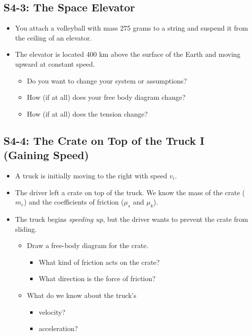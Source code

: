 \documentclass[]{article}
\begin{document}
\newpage
\begin{TeacherMargin}

\end{TeacherMargin}
\begin{PresentSpace}
\vspace{-10pt}
\section*{S4-3: The Space Elevator}
\vspace{-10pt}
\begin{itemize}
	\item You attach a volleyball with mass 275 grams to a string and suspend it from the ceiling of an elevator.
	\item The elevator is located 400 km above the surface of the Earth and moving upward at constant speed.
	\begin{itemize}
		\item Do you want to change your system or assumptions?
		\item How (if at all) does your free body diagram change?
		\item How (if at all) does the tension change?
	\end{itemize}
\end{itemize}
\end{PresentSpace}
\newpage
\begin{TeacherMargin}

\end{TeacherMargin}
\begin{PresentSpace}
\vspace{-10pt}
\section*{S4-4: The Crate on Top of the Truck I (Gaining Speed)}
\vspace{-10pt}
\begin{itemize}
	\item A truck is initially moving to the right with speed $v_{i}$.
	\item The driver left a crate on top of the truck. We know the mass of the crate ($m_{c}$) and the coefficients of friction ($\mu_{s}$ and $\mu_{k}$).
	\item The truck begins \textit{speeding up}, but the driver wants to prevent the crate from sliding.
	\begin{itemize}
		\item Draw a free-body diagram for the crate.
		\begin{itemize}
			\item What kind of friction acts on the crate?
			\item What direction is the force of friction?
		\end{itemize}
		\item What do we know about the truck's
		\begin{itemize}
			\item velocity?
			\item acceleration?
		\end{itemize}
	\end{itemize}
\end{itemize}
\end{PresentSpace}
\end{document}
